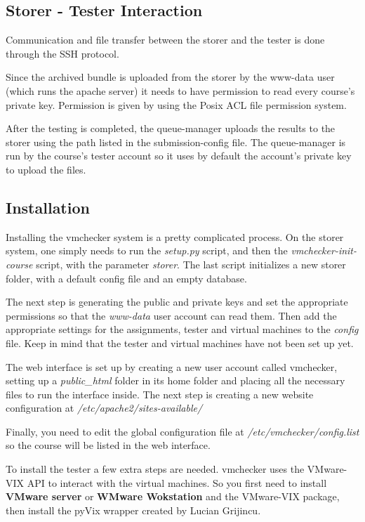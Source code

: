 \subsection{Storer - Tester Interaction}
\label{sub-sec:interaction}

Communication and file transfer between the storer and the tester is done
through the SSH protocol. 

Since the archived bundle is uploaded from the storer by the www-data user (which
runs the apache server) it needs to have permission to read every course's private key. 
Permission is given by using the Posix ACL file permission system.

After the testing is completed, the queue-manager uploads the results to the storer
using the path listed in the submission-config file. The queue-manager is run by the 
course's tester account so it uses by default the account's private key to upload
the files.

\subsection{Installation}
\label{sub-sec:install}

Installing the vmchecker system is a pretty complicated process.
On the storer system, one simply needs to run the \textit{setup.py} script, and then 
the \textit{vmchecker-init-course} script, with the parameter \textit{storer}. The last script
initializes a new storer folder, with a default config file and an empty database.

The next step is generating the public and private keys and set the appropriate 
permissions so that the \textit{www-data} user account can read them. Then add the appropriate 
settings for the assignments, tester and virtual machines to the {\it config} file.
Keep in mind that the tester and virtual machines have not been set up yet.

The web interface is set up by creating a new user account called vmchecker,
setting up a \textit{public_html} folder in its home folder and placing all the necessary files
to run the interface inside. The next step is creating a new website configuration at 
\textit{/etc/apache2/sites-available/}

Finally, you need to edit the global configuration file at \textit{/etc/vmchecker/config.list}
so the course will be listed in the web interface.

To install the tester a few extra steps are needed. vmchecker uses the VMware-VIX
API to interact with the virtual machines. So you first need to install {\bf VMware
server} or {\bf WMware Wokstation} and the VMware-VIX package, then install the pyVix 
wrapper created by Lucian Grijincu.

